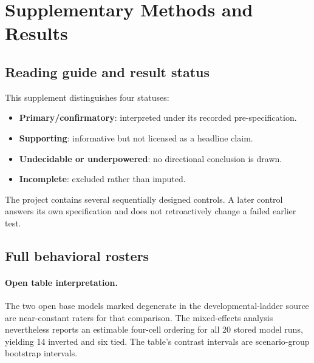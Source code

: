 \FloatBarrier
\let\supplementsubsection\subsection
\renewcommand{\subsection}{\FloatBarrier\supplementsubsection}

\section{Supplementary Methods and Results}

\subsection{Reading guide and result status}

This supplement distinguishes four statuses:
\begin{itemize}[leftmargin=*]
    \item \textbf{Primary/confirmatory}: interpreted under its recorded pre-specification.
    \item \textbf{Supporting}: informative but not licensed as a headline claim.
    \item \textbf{Undecidable or underpowered}: no directional conclusion is drawn.
    \item \textbf{Incomplete}: excluded rather than imputed.
\end{itemize}
The project contains several sequentially designed controls.
A later control answers its own specification and does not retroactively change a failed earlier test.

\subsection{Full behavioral rosters}



\paragraph{Open table interpretation.}
The two open base models marked degenerate in the developmental-ladder source are near-constant raters for that comparison.
The mixed-effects analysis nevertheless reports an estimable four-cell ordering for all 20 stored model runs, yielding 14 inverted and six tied.
The table's contrast intervals are scenario-group bootstrap intervals.

